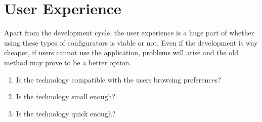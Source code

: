 \section{User Experience}
Apart from the development cycle, the user experience is a huge part of whether using these types of configurators is viable or not. Even if the development is way cheaper, if users cannot use the application, problems will arise and the old method may prove to be a better option.\begin{enumerate}
\item Is the technology compatible with the users browsing preferences?

\item Is the technology small enough?

\item Is the technology quick enough?

\end{enumerate}